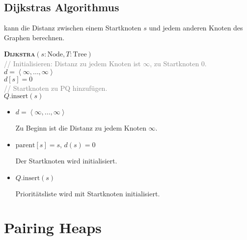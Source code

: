\subsection{Dijkstras Algorithmus}

 kann die Distanz zwischen einem Startknoten \( s \) und jedem anderen Knoten des Graphen berechnen.

\begin{pseudocode}
  \textbf{\textsc{Dijkstra}}\( (s : \text{Node}, T : \text{Tree}) \) \\
  \textcolor{gray}{// Initialisieren: Distanz zu jedem Knoten ist \( \infty \), zu Startknoten \( 0 \).} \\
  \( d = \left\langle \infty,\ldots,\infty \right\rangle \) \\
  \( d[s] = 0 \) \\
  \textcolor{gray}{// Startknoten zu PQ hinzufügen.} \\
  \( Q\text{.insert}(s) \)
\end{pseudocode}

\begin{itemize}
  \item \( d = \left\langle \infty,\ldots,\infty \right\rangle \)
  
  Zu Beginn ist die Distanz zu jedem Knoten \( \infty \).

  \item \( \text{parent}[s] = s \), \( d(s) = 0 \)
  
  Der Startknoten wird initialisiert.

  \item \( Q\text{.insert}(s) \) 

  Prioritätsliste wird mit Startknoten initialisiert.
\end{itemize}

\section{Pairing Heaps}

